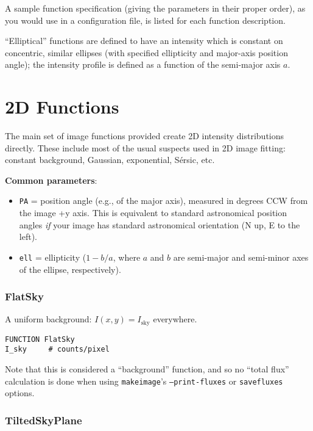 \documentclass[10pt,a4paper,article]{memoir}
\begin{document}
A sample function specification (giving the parameters in their proper order),
as you would use in a configuration file, is listed for each function
description.

``Elliptical'' functions are defined to have an intensity which is constant on
concentric, similar ellipses (with specified ellipticity and major-axis position angle);
the intensity profile is defined as a function of the semi-major axis $a$.


\section{2D Functions}

The main set of image functions provided create 2D intensity distributions
directly. These include most of the usual suspects used in 2D image fitting:
constant background, Gaussian, exponential, S{\'e}rsic, etc.

\medskip

\textbf{Common parameters}: 
\begin{itemize}
\item \texttt{PA} = position angle (e.g., of the major axis), measured in degrees CCW from
the image +y axis. This is equivalent to standard astronomical position angles \textit{if}
your image has standard astronomical orientation (N up, E to the left).
\item \texttt{ell} = ellipticity ($1 - b/a$, where $a$ and $b$ are semi-major and semi-minor
axes of the ellipse, respectively).
\end{itemize}


\subsubsection{FlatSky}

A uniform background: $I(x,y) = I_{\mathrm{sky}}$ everywhere.

\begin{verbatim}
FUNCTION FlatSky
I_sky     # counts/pixel
\end{verbatim}

Note that this is considered a ``background'' function, and so no ``total flux''
calculation is done when using \texttt{makeimage}'s \texttt{--print-fluxes} or
\texttt{savefluxes} options.


\subsubsection{TiltedSkyPlane}
\end{document}
